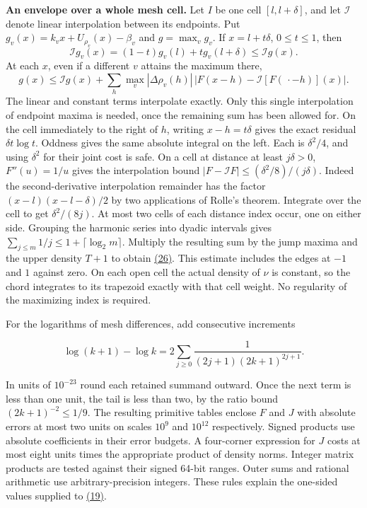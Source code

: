 \documentclass[11pt,a4paper]{article}
\begin{document}
\textbf{An envelope over a whole mesh cell.} Let \(I\) be one cell \([l,l+\delta]\), and let \(\mathcal I\) denote linear interpolation between its endpoints. Put \(g_v(x)=k_vx+U_{\rho_v}(x)-\beta_v\) and \(g=\max_v g_v\). If \(x=l+t\delta\), \(0\le t\le1\), then \[
 \mathcal I g_v(x)=(1-t)g_v(l)+t g_v(l+\delta)\le\mathcal I g(x).
\] At each \(x\), even if a different \(v\) attains the maximum there, \[
 g(x)\le\mathcal I g(x)+\sum_h\max_v|\Delta\rho_v(h)|
                   \,|F(x-h)-\mathcal I[F(\,\cdot-h)](x)|.
\] The linear and constant terms interpolate exactly. Only this single interpolation of endpoint maxima is needed, once the remaining sum has been allowed for. On the cell immediately to the right of \(h\), writing \(x-h=t\delta\) gives the exact residual \(\delta t\log t\). Oddness gives the same absolute integral on the left. Each is \(\delta^2/4\), and using \(\delta^2\) for their joint cost is safe. On a cell at distance at least \(j\delta>0\), \(F''(u)=1/u\) gives the interpolation bound \(|F-\mathcal IF|\le (\delta^2/8)/(j\delta)\). Indeed the second-derivative interpolation remainder has the factor \((x-l)(x-l-\delta)/2\) by two applications of Rolle's theorem. Integrate over the cell to get \(\delta^2/(8j)\). At most two cells of each distance index occur, one on either side. Grouping the harmonic series into dyadic intervals gives \(\sum_{j\le m}1/j\le1+\lceil\log_2 m\rceil\). Multiply the resulting sum by the jump maxima and the upper density \(T+1\) to obtain \hyperref[eq:26]{(26)}. This estimate includes the edges at \(-1\) and \(1\) against zero. On each open cell the actual density of \(\nu\) is constant, so the chord integrates to its trapezoid exactly with that cell weight. No regularity of the maximizing index is required.

For the logarithms of mesh differences, add consecutive increments

\[
 \log(k+1)-\log k=2\sum_{j\ge0}\frac{1}{(2j+1)(2k+1)^{2j+1}}.
\]

In units of \(10^{-23}\) round each retained summand outward. Once the next term is less than one unit, the tail is less than two, by the ratio bound \((2k+1)^{-2}\le1/9\). The resulting primitive tables enclose \(F\) and \(J\) with absolute errors at most two units on scales \(10^9\) and \(10^{12}\) respectively. Signed products use absolute coefficients in their error budgets. A four-corner expression for \(J\) costs at most eight units times the appropriate product of density norms. Integer matrix products are tested against their signed 64-bit ranges. Outer sums and rational arithmetic use arbitrary-precision integers. These rules explain the one-sided values supplied to \hyperref[eq:19]{(19)}.
\end{document}
